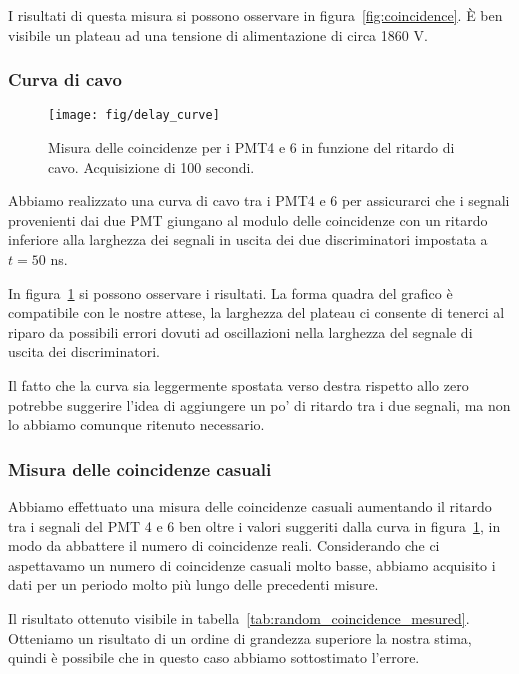 \documentclass[a4paper,10pt]{article}
\begin{document}
I risultati di questa misura si possono osservare in figura~\ref{fig:coincidence}. \`E ben visibile un plateau ad una tensione di alimentazione di circa 1860 V.	


\subsubsection{Curva di cavo}
\begin{figure}
\centering
\texttt{[image: fig/delay\_curve]}
\caption{Misura delle coincidenze per i PMT4 e 6 in funzione del ritardo di cavo. Acquisizione di 100 secondi.}
\label{fig:delay_curve}
\end{figure}
Abbiamo realizzato una curva di cavo tra i PMT4 e 6 per assicurarci che i segnali provenienti dai due PMT giungano al modulo delle coincidenze con un ritardo inferiore alla larghezza dei segnali in uscita dei due discriminatori impostata a $t = 50$ ns. 

In figura~\ref{fig:delay_curve} si possono osservare i risultati. La forma quadra del grafico è compatibile con le nostre attese, la larghezza del plateau ci consente di tenerci al riparo da possibili errori dovuti ad oscillazioni nella larghezza del segnale di uscita dei discriminatori. 

Il fatto che la curva sia leggermente spostata verso destra rispetto allo zero potrebbe suggerire l'idea di aggiungere un po' di ritardo tra i due segnali, ma non lo abbiamo comunque ritenuto necessario.
\subsubsection{Misura delle coincidenze casuali}
Abbiamo effettuato una misura delle coincidenze casuali aumentando il ritardo tra i segnali del PMT 4 e 6 ben oltre i valori suggeriti dalla curva in figura~\ref{fig:delay_curve}, in modo da abbattere il numero di coincidenze reali. Considerando che ci aspettavamo un numero di coincidenze casuali molto basse, abbiamo acquisito i dati per un periodo molto più lungo delle precedenti misure.

Il risultato ottenuto visibile in tabella~\ref{tab:random_coincidence_mesured}. Otteniamo un risultato di un ordine di grandezza superiore la nostra stima, quindi è possibile che in questo caso abbiamo sottostimato l'errore. 
\end{document}
